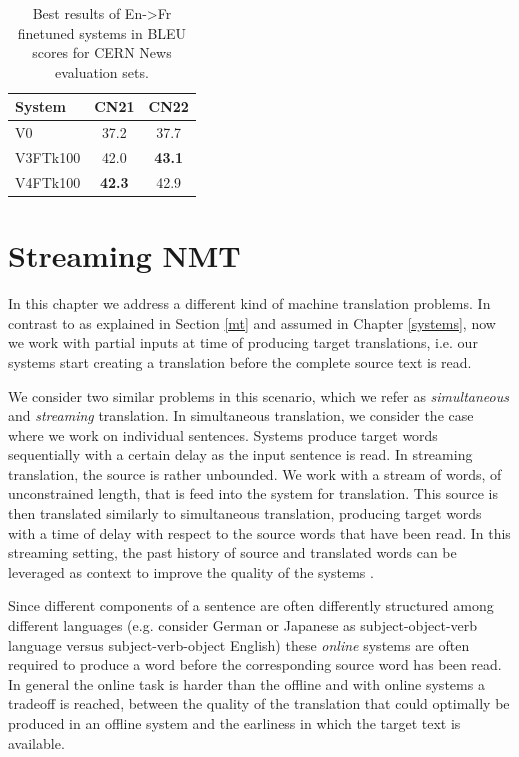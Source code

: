 \documentclass[11pt,english,listoffigures,listoftables]{tfgetsinf}
\begin{document}
\begin{table}
\caption{Best results of En->Fr finetuned systems in BLEU scores for CERN News evaluation sets.}
\centering
\begin{tabular}{l|c|c}
System & CN21 & CN22 \\
\hline
V0 & 37.2 & 37.7\\
V3FTk100 & 42.0 & \textbf{43.1}\\
V4FTk100 & \textbf{42.3} & 42.9\\
\end{tabular}
\label{table:bleuft}
\end{table}







\chapter{Streaming NMT}\label{strnmt}
In this chapter we address a different kind of machine translation problems. In contrast to as explained in Section \ref{mt} and assumed in Chapter \ref{systems}, now we work with partial inputs at time of producing target translations, i.e. our systems start creating a translation before the complete source text is read.

We consider two similar problems in this scenario, which we refer as \textit{simultaneous} and \textit{streaming} translation.
In simultaneous translation, we consider the case where we work on individual sentences. Systems produce target words sequentially with a certain delay as the input sentence is read. 
In streaming translation, the source is rather unbounded. We work with a stream of words, of unconstrained length, that is feed into the system for translation. This source is then translated similarly to simultaneous translation, producing target words with a time of delay with respect to the source words that have been read.
In this streaming setting, the past history of source and translated words can be leveraged as context to improve the quality of the systems \cite{https://doi.org/10.48550/arxiv.2203.02459}.

Since different components of a sentence are often differently structured among different languages (e.g. consider German or Japanese as subject-object-verb language versus subject-verb-object English) these \textit{online} systems are often required to produce a word before the corresponding source word has been read.
In general the online task is harder than the offline and with online systems a tradeoff is reached, between the quality of the translation that could optimally be produced in an offline system and the earliness in which the target text is available. 
\end{document}
